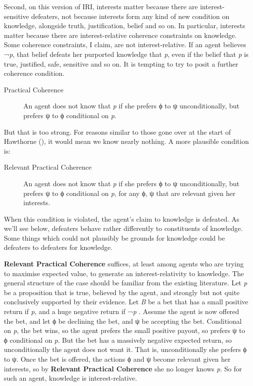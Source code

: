 \documentclass[
  11pt,
  letterpaper,
  DIV=11,
  numbers=noendperiod,
  twoside]{scrartcl}
\begin{document}
Second, on this version of IRI, interests matter because there are
interest-sensitive defeaters, not because interests form any kind of new
condition on knowledge, alongside truth, justification, belief and so
on. In particular, interests matter because there are interest-relative
coherence constraints on knowledge. Some coherence constraints, I claim,
are not interest-relative. If an agent believes ¬\emph{p}, that belief
defeats her purported knowledge that \emph{p}, even if the belief that
\emph{p} is true, justified, safe, sensitive and so on. It is tempting
to try to posit a further coherence condition.

\begin{description}
\item[Practical Coherence]
An agent does not know that \emph{p} if she prefers ϕ to ψ
unconditionally, but prefers ψ to ϕ conditional on \emph{p}.
\end{description}

But that is too strong. For reasons similar to those gone over at the
start of Hawthorne (), it would mean
we know nearly nothing. A more plausible condition is:

\begin{description}
\item[Relevant Practical Coherence]
An agent does not know that \emph{p} if she prefers ϕ to ψ
unconditionally, but prefers ψ to ϕ conditional on \emph{p}, for any ϕ,
ψ that are relevant given her interests.
\end{description}

When this condition is violated, the agent's claim to knowledge is
defeated. As we'll see below, defeaters behave rather differently to
constituents of knowledge. Some things which could not plausibly be
grounds for knowledge could be defeaters to defeaters for knowledge.

\textbf{Relevant Practical Coherence} suffices, at least among agents
who are trying to maximise expected value, to generate an
interest-relativity to knowledge. The general structure of the case
should be familiar from the existing literature. Let \emph{p} be a
proposition that is true, believed by the agent, and strongly but not
quite conclusively supported by their evidence. Let \emph{B} be a bet
that has a small positive return if \emph{p}, and a huge negative return
if ¬\emph{p} . Assume the agent is now offered the bet, and let ϕ be
declining the bet, and ψ be accepting the bet. Conditional on \emph{p},
the bet wins, so the agent prefers the small positive payout, so prefers
ψ to ϕ conditional on \emph{p}. But the bet has a massively negative
expected return, so unconditionally the agent does not want it. That is,
unconditionally she prefers ϕ to ψ. Once the bet is offered, the actions
ϕ and ψ become relevant given her interests, so by \textbf{Relevant
Practical Coherence} she no longer knows \emph{p}. So for such an agent,
knowledge is interest-relative.
\end{document}

